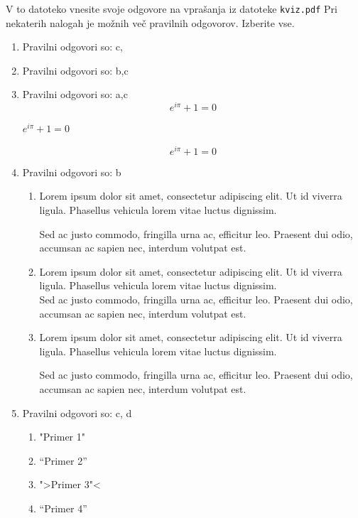 \documentclass[11pt]{article}
\begin{document}
V to datoteko vnesite svoje odgovore na vprašanja iz datoteke \texttt{kviz.pdf}
Pri nekaterih nalogah je možnih več pravilnih odgovorov. Izberite vse.

\begin{enumerate}
    \item Pravilni odgovori so: %
    c, 
    \item Pravilni odgovori so: %
    b,c 
    \item Pravilni odgovori so: a,c %
      \[ e^{i \pi} + 1 = 0 \]
      \begin{center}
          \( e^{i \pi} + 1 = 0 \)
      \end{center}
      \begin{equation*}
          e^{i \pi} + 1 = 0
      \end{equation*}
    
    \item Pravilni odgovori so: b %
        \begin{enumerate}
            \item {
Lorem ipsum dolor sit amet, consectetur adipiscing 
elit. Ut id viverra ligula. Phasellus vehicula lorem 
vitae luctus dignissim. 
                
Sed ac justo commodo, fringilla urna ac, efficitur 
leo. Praesent dui odio, accumsan ac sapien nec, 
interdum volutpat est. 
            }
            \item {
Lorem ipsum dolor sit amet, consectetur adipiscing 
elit. Ut id viverra ligula. Phasellus vehicula lorem 
vitae luctus dignissim. \\
Sed ac justo commodo, fringilla urna ac, efficitur 
leo. Praesent dui odio, accumsan ac sapien nec, 
interdum volutpat est.             }
            \item {
Lorem ipsum dolor sit amet, consectetur adipiscing 
elit. Ut id viverra ligula. Phasellus vehicula lorem 
vitae luctus dignissim. \par
Sed ac justo commodo, fringilla urna ac, efficitur 
leo. Praesent dui odio, accumsan ac sapien nec, 
interdum volutpat est.             }
        \end{enumerate}
    
      \item Pravilni odgovori so: c, d %
        \begin{enumerate}
          \item "Primer 1"
          \item ``Primer 2''
          \item ">Primer 3"<
          \item "`Primer 4"'
        \end{enumerate}


\end{enumerate}
\end{document}

